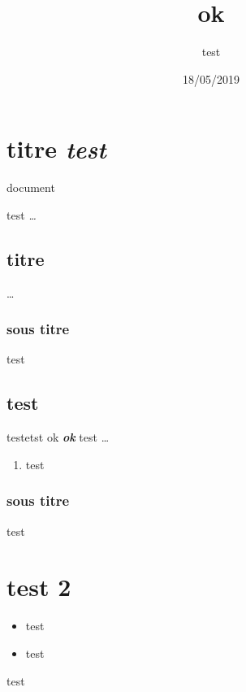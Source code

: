\author{test}
\title{ok}
\date{18/05/2019}


\maketitle

\section{titre \textit{test}}

document

test \textit{\ldots}

\subsection{titre}

\ldots

\subsubsection{sous titre}

test

\subsection{test}

testetst 
ok
\textit{\textbf{ok}}
test
\ldots

\begin{enumerate}
\item test
\end{enumerate}

\subsubsection{sous titre}

test

        \section{test 2}

    \begin{itemize}
    \item test
        \item test
\end{itemize}

test

